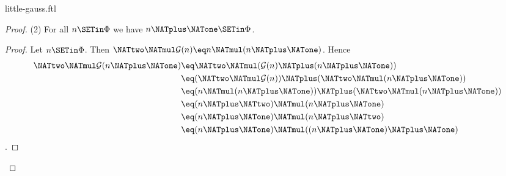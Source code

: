 \documentclass{article}
\newcommand{\gauss}{\mathcal{G}}
\begin{document}
\begin{smodule}{little-gauss.ftl}
\begin{forthel}
\begin{proof}
    (2) For all $n \SETin \Phi$ we have $n \NATplus \NATone \SETin \Phi$.
    \begin{proof}
      Let $n \SETin \Phi$.
      Then $\NATtwo \NATmul \gauss(n) \eq n \NATmul (n \NATplus \NATone)$.
      Hence
      \begin{align*}
              \NATtwo \NATmul \gauss(n \NATplus \NATone)
        & \eq \NATtwo \NATmul (\gauss(n) \NATplus (n \NATplus \NATone)) \\
        & \eq (\NATtwo \NATmul \gauss(n)) \NATplus (\NATtwo \NATmul (n \NATplus \NATone)) \\
        & \eq (n \NATmul (n \NATplus \NATone)) \NATplus (\NATtwo \NATmul (n \NATplus \NATone)) \\
        & \eq (n \NATplus \NATtwo) \NATmul (n \NATplus \NATone) \\
        & \eq (n \NATplus \NATone) \NATmul (n \NATplus \NATtwo) \\
        & \eq (n \NATplus \NATone) \NATmul ((n \NATplus \NATone) \NATplus \NATone)
      \end{align*}.
    \end{proof}
  \end{proof}
\end{forthel}

\printbibliography
{}
\end{smodule}
\end{document}
